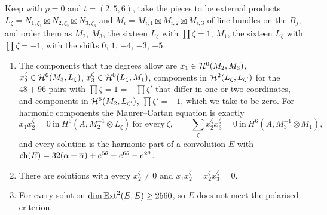 \begin{proposition}\label{prop:explicitconvolution}
Keep  with $p=0$ and $t=(2,5,6)$, take the pieces to
be external products $L_{\zeta}=N_{1,\zeta_{1}}\boxtimes N_{2,\zeta_{2}}
\boxtimes N_{3,\zeta_{3}}$ and $M_{i}=M_{i,1}\boxtimes M_{i,2}\boxtimes
M_{i,3}$ of line bundles on the $B_{j}$, and order them as $M_{2}$, $M_{3}$,
the sixteen $L_{\zeta}$ with $\prod\zeta=1$, $M_{1}$, the sixteen $L_{\zeta}$
with $\prod\zeta=-1$, with the shifts $0$, $1$, $-4$, $-3$, $-5$.
\begin{enumerate}[label=\textup{(\roman*)},leftmargin=2.6em,itemsep=2pt]
\item The components that the degrees allow are
  $x_{1}\in\mathcal{H}^{0}(M_{2},M_{3})$, $x_{2}^{\zeta}\in\mathcal{H}^{6}(M_{3},L_{\zeta})$,
  $x_{3}^{\zeta}\in\mathcal{H}^{0}(L_{\zeta},M_{1})$, components in
  $\mathcal{H}^{2}(L_{\zeta},L_{\zeta'})$ for the $48+96$ pairs with
  $\prod\zeta=1=-\prod\zeta'$ that differ in one or two coordinates, and
  components in $\mathcal{H}^{6}(M_{2},L_{\zeta'})$, $\prod\zeta'=-1$, which we take
  to be zero. For harmonic components the Maurer--Cartan equation is exactly
  \[
    x_{1}x_{2}^{\zeta}=0\ \text{in}\ H^{6}(A,M_{2}^{-1}\otimes L_{\zeta})
    \ \text{for every}\ \zeta,
    \qquad
    \sum_{\zeta}x_{2}^{\zeta}x_{3}^{\zeta}=0\ \text{in}\
    H^{6}(A,M_{3}^{-1}\otimes M_{1}),
  \]
  and every solution is the harmonic part of a convolution $E$ with
  $\operatorname{ch}(E)=32(\alpha+\overline{\alpha})+e^{5\theta}-e^{6\theta}-e^{2\theta}$.
\item There are solutions with every $x_{2}^{\zeta}\ne0$ and
  $x_{1}x_{2}^{\zeta}=x_{2}^{\zeta}x_{3}^{\zeta}=0$.
\item For every solution $\dim\operatorname{Ext}^{2}(E,E)\ge2560$, so $E$ does not meet
  the polarised criterion.
\end{enumerate}
\end{proposition}

